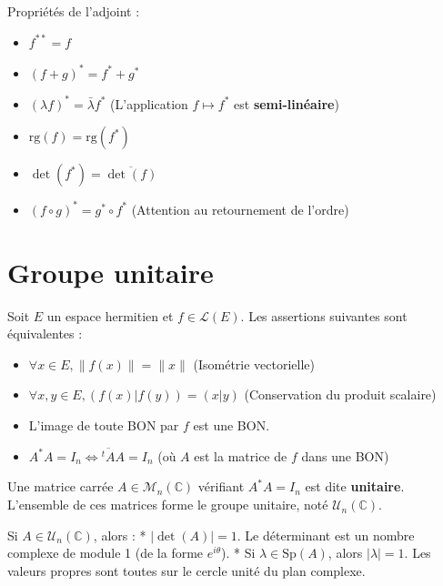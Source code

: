\documentclass[french]{yLectureNote}
\begin{document}
\begin{proposition}
    Propriétés de l'adjoint :
    \begin{itemize}
        \item $f^{**} = f$
        \item $(f+g)^* = f^* + g^*$
        \item $(\lambda f)^* = \bar{\lambda}f^*$ (L'application $f \mapsto f^*$ est \textbf{semi-linéaire})
        \item $\text{rg}(f) = \text{rg}(f^*)$
        \item $\det(f^*) = \overline{\det(f)}$
        \item $(f \circ g)^* = g^* \circ f^*$ (Attention au retournement de l'ordre)
    \end{itemize}
\end{proposition}

\section{Groupe unitaire}

\begin{proposition}
    Soit $E$ un espace hermitien et $f \in \mathcal{L}(E)$. Les assertions suivantes sont équivalentes :
    \begin{itemize}
        \item $\forall x \in E, \|f(x)\| = \|x\|$ (Isométrie vectorielle)
        \item $\forall x, y \in E, (f(x)|f(y)) = (x|y)$ (Conservation du produit scalaire)
        \item L'image de toute BON par $f$ est une BON.
        \item $A^*A = I_n \iff \overline{{}^tA}A = I_n$ (où $A$ est la matrice de $f$ dans une BON)
    \end{itemize}
\end{proposition}

\begin{definition}
    Une matrice carrée $A \in \mathcal{M}_n(\mathbb{C})$ vérifiant $A^*A = I_n$ est dite \textbf{unitaire}. L'ensemble de ces matrices forme le groupe unitaire, noté $\mathcal{U}_n(\mathbb{C})$.
\end{definition}

\begin{proposition}
    Si $A \in \mathcal{U}_n(\mathbb{C})$, alors :
    * $|\det(A)| = 1$. Le déterminant est un nombre complexe de module 1 (de la forme $e^{i\theta}$).
    * Si $\lambda \in \text{Sp}(A)$, alors $|\lambda| = 1$. Les valeurs propres sont toutes sur le cercle unité du plan complexe.
\end{proposition}
\end{document}
